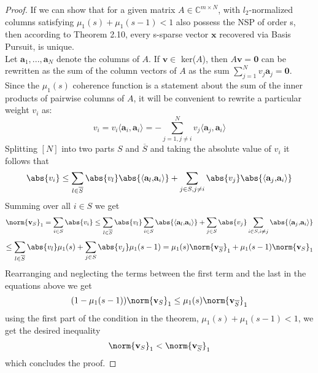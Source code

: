 \begin{proof}
If we can show that for a given matrix $A \in \mathbb{C}^{m \times N}$, with $l_2$-normalized columns satisfying $\mu_1(s) + \mu_1(s-1) < 1$ also possess the NSP of order s, then according to Theorem 2.10, every s-sparse vector $\mathbf{x}$ recovered via Basis Pursuit, is unique. \\ Let $\mathbf{a}_1,...,\mathbf{a}_N$ denote the columns of $A$. If $\mathbf{v} \in $ ker($A$), then $A\mathbf{v}=\mathbf{0}$ can be rewritten as the sum of the column vectors of $A$ as the sum $\sum_{j=1}^{N}v_j\mathbf{a}_j = \mathbf{0}$. Since the $\mu_1(s)$ coherence function is a statement about the sum of the inner products of pairwise columns of $A$, it will be convenient to rewrite a particular weight $v_i$ as:
\begin{equation*}
v_i = v_i\langle\mathbf{a}_i{,}\mathbf{a}_i\rangle = -\sum_{j=1, j \neq i}^{N}v_j\langle\mathbf{a}_j{,}\mathbf{a}_i\rangle 
\end{equation*}
Splitting $[N]$ into two parts $S$ and $\overline{S}$ and taking the absolute value of $v_i$ it follows that
\begin{equation*}
\abs{v_i} \leq \sum_{l \in \overline{S}}\abs{v_l} \abs{\langle\mathbf{a}_l{,}\mathbf{a}_i\rangle} +\sum_{j \in S, j \neq i}\abs{v_j}\abs{\langle\mathbf{a}_j{,}\mathbf{a}_i\rangle}
\end{equation*}
Summing over all $i \in S$ we get 
\begin{equation*}
\norm{ \mathbf{v}_{S}}_{1} = \sum_{i \in S}\abs{v_i} \leq \sum_{l \in \overline{S}}\abs{v_l}\sum_{i \in S}\abs{\langle\mathbf{a}_l{,}\mathbf{a}_i\rangle} +\sum_{j \in S}\abs{v_j}\sum_{i \in S, i \neq j}\abs{\langle\mathbf{a}_j{,}\mathbf{a}_i\rangle}
\end{equation*}
 \begin{equation*}
 \leq \sum_{l \in \overline{S}}\abs{v_l}\mu_1(s) + \sum_{j \in S}\abs{v_j}\mu_1(s-1) = \mu_1(s) \norm{ \mathbf{v}_{\overline{S}}}_{1} +\mu_1(s-1)\norm{ \mathbf{v}_{S}}_{1} 
\end{equation*}
Rearranging and neglecting the terms between the first term and the last in the equations above we get 
\begin{equation*}
(1-\mu_1(s-1))\norm{ \mathbf{v}_{S}}_{1} \leq \mu_1(s) \norm{ \mathbf{v}_{\overline{S}}}_{1}
\end{equation*}
using the first part of the condition in the theorem, $\mu_1(s) + \mu_1(s-1) < 1$, we get the desired inequality
\begin{equation*}
\norm{ \mathbf{v}_{S}}_{1}  <  \norm{ \mathbf{v}_{\overline{S}}}_{1} 
\end{equation*}
which concludes the proof.

\end{proof}



